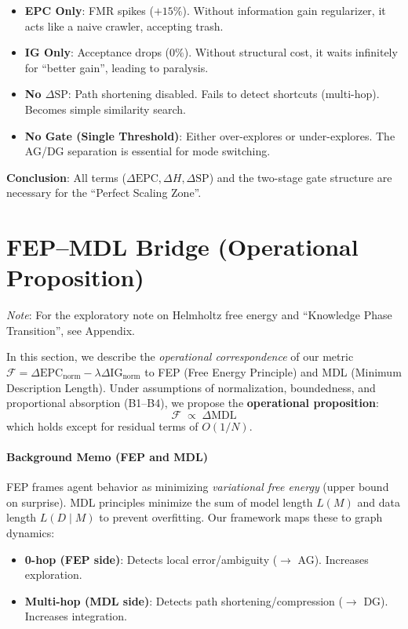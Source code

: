 \documentclass[12pt]{article}
\newcommand{\F}{\mathcal{F}}
\newcommand{\gednorm}{\Delta\mathrm{EPC}_{\mathrm{norm}}}
\newcommand{\ignorm}{\Delta\mathrm{IG}_{\mathrm{norm}}}
\begin{document}
\begin{table}[H]
  \centering
  \caption{Ablation summary (equal resources).}
  \label{tab:exp23_ablation_lite_ja}
  
\end{table}

\begin{itemize}
    \item \textbf{EPC Only}: FMR spikes ($+15\%$). Without information gain regularizer, it acts like a naive crawler, accepting trash.
    \item \textbf{IG Only}: Acceptance drops ($0\%$). Without structural cost, it waits infinitely for ``better gain'', leading to paralysis.
    \item \textbf{No $\Delta\mathrm{SP}$}: Path shortening disabled. Fails to detect shortcuts (multi-hop). Becomes simple similarity search.
    \item \textbf{No Gate (Single Threshold)}: Either over-explores or under-explores. The AG/DG separation is essential for mode switching.
\end{itemize}

\textbf{Conclusion}: All terms ($\Delta\mathrm{EPC}, \Delta H, \Delta\mathrm{SP}$) and the two-stage gate structure are necessary for the ``Perfect Scaling Zone''.

\section{FEP--MDL Bridge (Operational Proposition)}
\label{sec:fep_mdl_bridge}
\label{sec:dual_fep_mdl}

\noindent\textit{Note}: For the exploratory note on Helmholtz free energy and ``Knowledge Phase Transition'', see Appendix.

In this section, we describe the \emph{operational correspondence} of our metric $\F=\gednorm-\lambda\ignorm$ to FEP (Free Energy Principle) and MDL (Minimum Description Length). Under assumptions of normalization, boundedness, and proportional absorption (B1--B4), we propose the \textbf{operational proposition}:
\[
    \F \;\propto\; \Delta\mathrm{MDL}
\]
which holds except for residual terms of $O(1/N)$.

\paragraph{Background Memo (FEP and MDL)}\;
FEP frames agent behavior as minimizing \emph{variational free energy} (upper bound on surprise). MDL principles minimize the sum of model length $L(M)$ and data length $L(D\mid M)$ to prevent overfitting. Our framework maps these to graph dynamics:
\begin{itemize}
    \item \textbf{0-hop (FEP side)}: Detects local error/ambiguity ($\to$ AG). Increases exploration.
    \item \textbf{Multi-hop (MDL side)}: Detects path shortening/compression ($\to$ DG). Increases integration.
\end{itemize}
\end{document}
